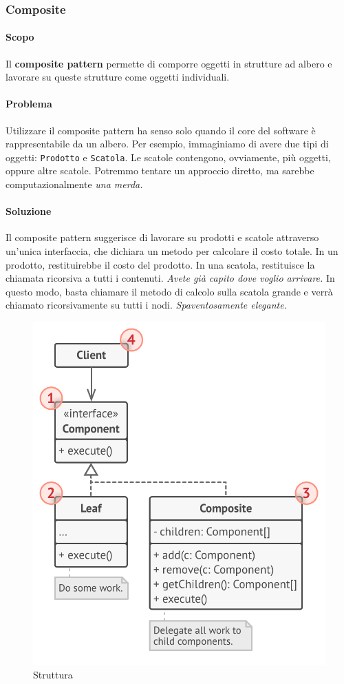 \documentclass[11pt]{article}
\newcommand{\code}[1]{\texttt{#1}}
\begin{document}
\subsubsection{Composite}
\paragraph{Scopo}
Il \textbf{composite pattern} permette di comporre oggetti in strutture ad albero e lavorare su queste strutture come oggetti individuali. 

\paragraph{Problema}
Utilizzare il composite pattern ha senso solo quando il core del software è rappresentabile da un albero. Per esempio, immaginiamo di avere due tipi di oggetti: \code{Prodotto} e \code{Scatola}. Le scatole contengono, ovviamente, più oggetti, oppure altre scatole. Potremmo tentare un approccio diretto, ma sarebbe computazionalmente \textit{una merda.}
\paragraph{Soluzione}
Il composite pattern suggerisce di lavorare su prodotti e scatole attraverso un'unica interfaccia, che dichiara un metodo per calcolare il costo totale. In un prodotto, restituirebbe il costo del prodotto. In una scatola, restituisce la chiamata ricorsiva a tutti i contenuti. \textit{Avete già capito dove voglio arrivare.} In questo modo, basta chiamare il metodo di calcolo sulla scatola grande e verrà chiamato ricorsivamente su tutti i nodi. \textit{Spaventosamente elegante.}
\begin{figure}[H]
    \centering
    \includegraphics[width=\linewidth]{res/teoria/Composite.png}
    \caption{Struttura}
\end{figure}
\end{document}
